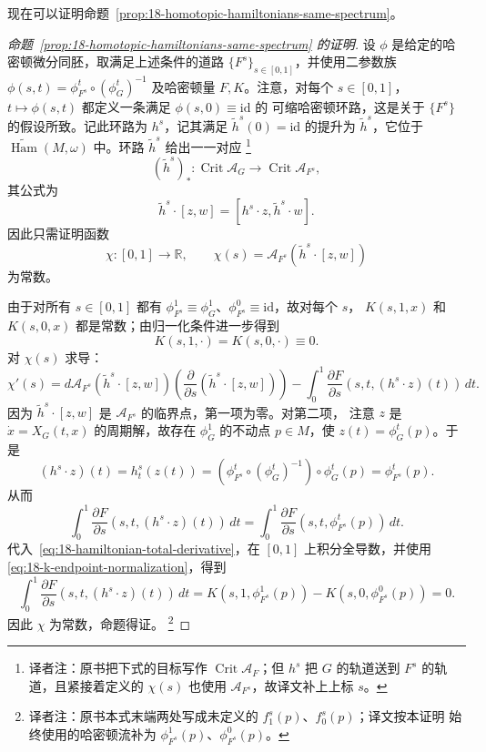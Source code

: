 现在可以证明命题~\ref{prop:18-homotopic-hamiltonians-same-spectrum}。

\begin{proof}[命题~\ref{prop:18-homotopic-hamiltonians-same-spectrum} 的证明]
设 $\phi$ 是给定的哈密顿微分同胚，取满足上述条件的道路
$\{F^s\}_{s\in[0,1]}$，并使用二参数族
$\phi(s,t)=\phi_{F^s}^t\circ(\phi_G^t)^{-1}$ 及哈密顿量 $F,K$。注意，对每个
$s\in[0,1]$，$t\mapsto\phi(s,t)$ 都定义一条满足 $\phi(s,0)\equiv\mathrm{id}$ 的
可缩哈密顿环路，这是关于 $\{F^s\}$ 的假设所致。记此环路为 $h^s$，记其满足
$\widetilde h^s(0)=\mathrm{id}$ 的提升为 $\widetilde h^s$，它位于
$\widetilde{\operatorname{Ham}}(M,\omega)$ 中。环路 $\widetilde h^s$ 给出一一对应
\footnote{译者注：原书把下式的目标写作 $\operatorname{Crit}\mathcal A_F$；但
$h^s$ 把 $G$ 的轨道送到 $F^s$ 的轨道，且紧接着定义的 $\chi(s)$ 也使用
$\mathcal A_{F^s}$，故译文补上上标 $s$。}
\[
 (\widetilde h^s)_*: \operatorname{Crit}\mathcal A_G
 \longrightarrow\operatorname{Crit}\mathcal A_{F^s},
\]
其公式为
\[
 \widetilde h^s\cdot[z,w]=[h^s\cdot z,\widetilde h^s\cdot w].
\]
因此只需证明函数
\[
 \chi:[0,1]\to\mathbb R,\qquad
 \chi(s)=\mathcal A_{F^s}(\widetilde h^s\cdot[z,w])
\]
为常数。

由于对所有 $s\in[0,1]$ 都有
$\phi_{F^s}^1\equiv\phi_G^1$、$\phi_{F^s}^0\equiv\mathrm{id}$，故对每个 $s$，
$K(s,1,x)$ 和 $K(s,0,x)$ 都是常数；由归一化条件进一步得到
\begin{equation}
 K(s,1,\cdot)=K(s,0,\cdot)\equiv0.
 \label{eq:18-k-endpoint-normalization}
\end{equation}
对 $\chi(s)$ 求导：
\[
 \chi'(s)=d\mathcal A_{F^s}(\widetilde h^s\cdot[z,w])
 \left(\frac\partial{\partial s}(\widetilde h^s\cdot[z,w])\right)
 -\int_0^1\frac{\partial F}{\partial s}
 (s,t,(h^s\cdot z)(t))\,dt.
\]
因为 $\widetilde h^s\cdot[z,w]$ 是 $\mathcal A_{F^s}$ 的临界点，第一项为零。对第二项，
注意 $z$ 是 $\dot x=X_G(t,x)$ 的周期解，故存在 $\phi_G^1$ 的不动点 $p\in M$，使
$z(t)=\phi_G^t(p)$。于是
\[
 (h^s\cdot z)(t)=h_t^s(z(t))
 =(\phi_{F^s}^t\circ(\phi_G^t)^{-1})\circ\phi_G^t(p)
 =\phi_{F^s}^t(p).
\]
从而
\[
 \int_0^1\frac{\partial F}{\partial s}(s,t,(h^s\cdot z)(t))\,dt
 =\int_0^1\frac{\partial F}{\partial s}(s,t,\phi_{F^s}^t(p))\,dt.
\]
代入~\eqref{eq:18-hamiltonian-total-derivative}，在 $[0,1]$ 上积分全导数，并使用
\eqref{eq:18-k-endpoint-normalization}，得到
\[
 \int_0^1\frac{\partial F}{\partial s}(s,t,(h^s\cdot z)(t))\,dt
 =K(s,1,\phi_{F^s}^1(p))-K(s,0,\phi_{F^s}^0(p))=0.
\]
因此 $\chi$ 为常数，命题得证。
\footnote{译者注：原书本式末端两处写成未定义的 $f_1^s(p)$、$f_0^s(p)$；译文按本证明
始终使用的哈密顿流补为 $\phi_{F^s}^1(p)$、$\phi_{F^s}^0(p)$。}
\end{proof}

